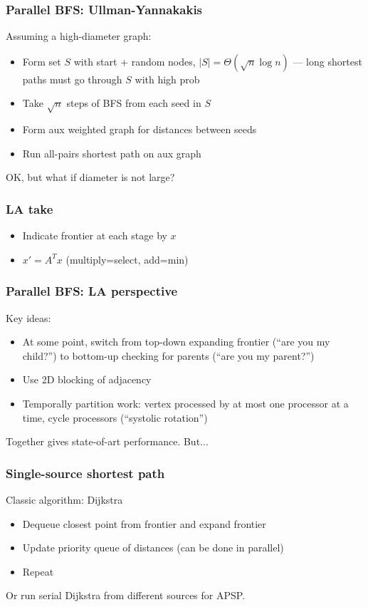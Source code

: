 \documentclass{beamer}
\begin{document}
\begin{frame}
  \frametitle{Parallel BFS: Ullman-Yannakakis}

  Assuming a high-diameter graph:
  \begin{itemize}
  \item Form set $S$ with start + random nodes, $|S| = \Theta(\sqrt{n}
    \log n)$ --- long shortest paths must go through $S$ with high prob
  \item Take $\sqrt{n}$ steps of BFS from each seed in $S$
  \item Form aux weighted graph for distances between seeds
  \item Run all-pairs shortest path on aux graph
  \end{itemize}
  OK, but what if diameter is not large?
  
\end{frame}

\begin{frame}
  \frametitle{LA take}

  \begin{itemize}
  \item Indicate frontier at each stage by $x$
  \item $x' = A^T x$ (multiply=select, add=min)
  \end{itemize}
\end{frame}

\begin{frame}
  \frametitle{Parallel BFS: LA perspective}

  Key ideas:
  \begin{itemize}
  \item At some point, switch from top-down expanding frontier (``are you my
    child?'') to bottom-up checking for parents (``are you my parent?'')
  \item Use 2D blocking of adjacency
  \item Temporally partition work: vertex processed by at most one
    processor at a time, cycle processors (``systolic rotation'')
  \end{itemize}
  Together gives state-of-art performance.  But...
\end{frame}

\begin{frame}
  \frametitle{Single-source shortest path}

  Classic algorithm: Dijkstra
  \begin{itemize}
  \item Dequeue closest point from frontier and expand frontier
  \item Update priority queue of distances (can be done in parallel)
  \item Repeat
  \end{itemize}
  Or run serial Dijkstra from different sources for APSP.
\end{frame}
\end{document}
